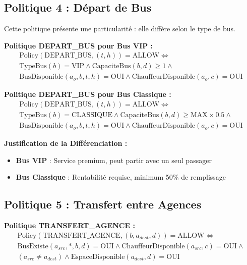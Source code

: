\documentclass[12pt,a4paper]{article}
\begin{document}
    \subsection{Politique 4 : Départ de Bus}

    Cette politique présente une particularité : elle diffère selon le type de bus.

    \begin{definitionbox}
        \textbf{Politique DEPART\_BUS pour Bus VIP :}
        \begin{multline}
            \text{Policy}(\text{DEPART\_BUS}, (t, h)) = \text{ALLOW} \Leftrightarrow \\
            \text{TypeBus}(b) = \text{VIP} \wedge \text{CapaciteBus}(b, d) \geq 1 \wedge \\
            \text{BusDisponible}(a_o, b, t, h) = \text{OUI} \wedge \text{ChauffeurDisponible}(a_o, c) = \text{OUI}
        \end{multline}

        \textbf{Politique DEPART\_BUS pour Bus Classique :}
        \begin{multline}
            \text{Policy}(\text{DEPART\_BUS}, (t, h)) = \text{ALLOW} \Leftrightarrow \\
            \text{TypeBus}(b) = \text{CLASSIQUE} \wedge \text{CapaciteBus}(b, d) \geq \text{MAX} \times 0.5 \wedge \\
            \text{BusDisponible}(a_o, b, t, h) = \text{OUI} \wedge \text{ChauffeurDisponible}(a_o, c) = \text{OUI}
        \end{multline}
    \end{definitionbox}

    \textbf{Justification de la Différenciation :}
    \begin{itemize}
        \item \textbf{Bus VIP} : Service premium, peut partir avec un seul passager
        \item \textbf{Bus Classique} : Rentabilité requise, minimum 50\% de remplissage
    \end{itemize}

    \subsection{Politique 5 : Transfert entre Agences}

    \begin{definitionbox}
        \textbf{Politique TRANSFERT\_AGENCE :}
        \begin{multline}
            \text{Policy}(\text{TRANSFERT\_AGENCE}, (b, a_{dest}, d)) = \text{ALLOW} \Leftrightarrow \\
            \text{BusExiste}(a_{src}, *, b, d) = \text{OUI} \wedge \text{ChauffeurDisponible}(a_{src}, c) = \text{OUI} \wedge \\
            (a_{src} \neq a_{dest}) \wedge \text{EspaceDisponible}(a_{dest}, d) = \text{OUI}
        \end{multline}
    \end{definitionbox}
\end{document}
